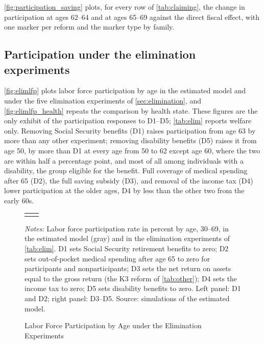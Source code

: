 \autoref{fig:participation_saving} plots, for every row of \autoref{tab:claiming}, the change in participation at ages 62--64 and at ages 65--69 against the direct fiscal effect, with one marker per reform and the marker type by family. %


\subsection{Participation under the elimination experiments}\label{app:elimlfp}

\autoref{fig:elimlfp} plots labor force participation by age in the estimated model and under the five elimination experiments of \autoref{sec:elimination}, and \autoref{fig:elimlfp_health} repeats the comparison by health state. These figures are the only exhibit of the participation responses to D1--D5; \autoref{tab:elim} reports welfare only. Removing Social Security benefits (D1) raises participation from age 63 by more than any other experiment; removing disability benefits (D5) raises it from age 50, by more than D1 at every age from 50 to 62 except age 60, where the two are within half a percentage point, and most of all among individuals with a disability, the group eligible for the benefit. Full coverage of medical spending after 65 (D2), the full saving subsidy (D3), and removal of the income tax (D4) lower participation at the older ages, D4 by less than the other two from the early 60s.

\begin{figure}[!tp]
\centering
\caption{Labor Force Participation by Age under the Elimination Experiments}
\label{fig:elimlfp}
\vspace{6pt}
\begin{tabular}{cc}
 & 
\end{tabular}
\begin{minipage}{0.95\textwidth}\footnotesize{}
\textit{Notes:} Labor force participation rate in percent by age, 30--69, in the estimated model (gray) and in the elimination experiments of \autoref{tab:elim}. D1 sets Social Security retirement benefits to zero; D2 sets out-of-pocket medical spending after age 65 to zero for participants and nonparticipants; D3 sets the net return on assets equal to the gross return (the K3 reform of \autoref{tab:other}); D4 sets the income tax to zero; D5 sets disability benefits to zero. Left panel: D1 and D2; right panel: D3--D5. Source: simulations of the estimated model.
\end{minipage}
\end{figure}

